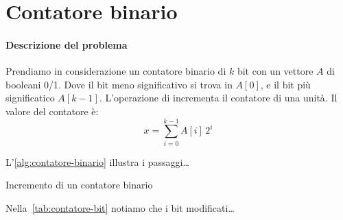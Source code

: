 \section{Contatore binario}

\paragraph{Descrizione del problema}
Prendiamo in considerazione un contatore binario di \(k\) bit con un vettore \(A\) di booleani 0/1.
Dove il bit meno significativo si trova in \(A[0]\), e il bit più significatico \(A[k-1]\).
L'operazione di \increment{} incrementa il contatore di una unità.
Il valore del contatore è:
\[
    x = \sum_{i=0}^{k-1} A[i] \, 2^i
\]

L'\cref{alg:contatore-binario} illustra i passaggi\dots

\begin{algorithm}[hb]
    \caption{Incremento di un contatore binario}%
    \label{alg:contatore-binario}
\end{algorithm}

Nella~\cref{tab:contatore-bit} notiamo che i bit modificati\dots

